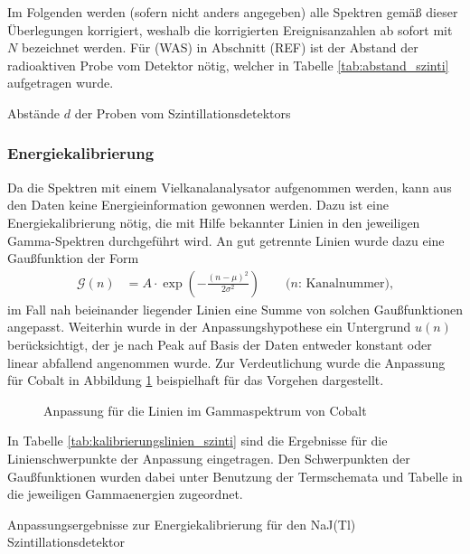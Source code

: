 \documentclass[11pt, a4paper]{article}
\numberwithin{equation}{section}
\begin{document}
Im Folgenden werden (sofern nicht anders angegeben) alle Spektren gemäß dieser Überlegungen korrigiert, weshalb die korrigierten Ereignisanzahlen ab sofort mit $N$ bezeichnet werden.
Für (WAS) in Abschnitt (REF) ist der Abstand der radioaktiven Probe vom Detektor nötig, welcher in Tabelle \ref{tab:abstand_szinti} aufgetragen wurde.
\begin{table}[h]
	\centering
	
	\caption{Abstände $d$ der Proben vom Szintillationsdetektors}
	\label{tab:abstand_szinti}
\end{table}


\subsubsection{Energiekalibrierung}
\label{sec:kalibrierung_szinti}
Da die Spektren mit einem Vielkanalanalysator aufgenommen werden, kann aus den Daten keine Energieinformation gewonnen werden.
Dazu ist eine Energiekalibrierung nötig, die mit Hilfe bekannter Linien in den jeweiligen Gamma-Spektren durchgeführt wird.
An gut getrennte Linien wurde dazu eine Gaußfunktion der Form
\begin{align}
\mathcal{G}(n) &= A \cdot \exp\left( - \frac{(n - \mu)^2}{2 \sigma^2}\right) \qquad\text{($n$: Kanalnummer),}
\label{eq:gaussfithypothese}
\end{align}
im Fall nah beieinander liegender Linien eine Summe von solchen Gaußfunktionen angepasst.
Weiterhin wurde in der Anpassungshypothese ein Untergrund $u(n)$ berücksichtigt, der je nach Peak auf Basis der Daten entweder konstant oder linear abfallend angenommen wurde.
Zur Verdeutlichung wurde die Anpassung für Cobalt in Abbildung \ref{fig:fit_cobalt} beispielhaft für das Vorgehen dargestellt.
\begin{figure}[ht]
	\centering
	\resizebox{0.85\textwidth}{!}{
	
	}
	\caption{Anpassung für die Linien im Gammaspektrum von Cobalt}
	\label{fig:fit_cobalt}
\end{figure}
In Tabelle \ref{tab:kalibrierungslinien_szinti} sind die Ergebnisse für die Linienschwerpunkte der Anpassung eingetragen.
Den Schwerpunkten der Gaußfunktionen wurden dabei unter Benutzung der Termschemata und Tabelle in \cite{anleitung} die jeweiligen Gammaenergien zugeordnet.
\begin{table}[ht]
	\centering
	
	\caption{Anpassungsergebnisse zur Energiekalibrierung für den NaJ(Tl) Szintillationsdetektor}
	\label{tab:kalibrierungslinien_szinti}
\end{table}
\end{document}

